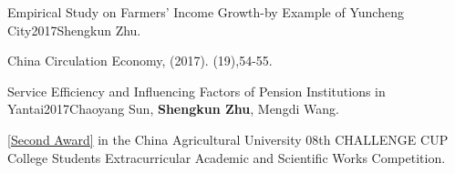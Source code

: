 \documentclass{joel_cv}
\begin{document}
\begin{enumerate}[label={[\arabic*]}]
	
	\item \begin{sectionContentNormal}{Empirical Study on Farmers' Income Growth-by Example of Yuncheng City}{2017}{Shengkun Zhu.}
		\item China Circulation Economy, (2017). (19),54-55.
		\quad[\href{https://kns.cnki.net/kcms/detail/detail.aspx?dbcode=CJFD&dbname=CJFDLAST2017&filename=QGSQ201719028&uniplatform=NZKPT&v=IsduICfXGkpNfx1F_0K9u6eESoBSqhWDWF8tW_7gLvlD707-79CtCDU51kR-3Rqb}{Paper}]
	\end{sectionContentNormal}
	
	
	
	\item \begin{sectionContentNormal}{Service Efficiency and Influencing Factors of Pension Institutions in Yantai}{2017}{Chaoyang Sun, \textbf{Shengkun Zhu}, Mengdi Wang.}
		\item \href{https://zhu-sk.github.io/ChallengeCup.jpg}{[Second Award]} in the China Agricultural University 08th CHALLENGE CUP College Students Extracurricular Academic and Scientific Works Competition. 
	\end{sectionContentNormal}

\end{enumerate}



\end{document}
